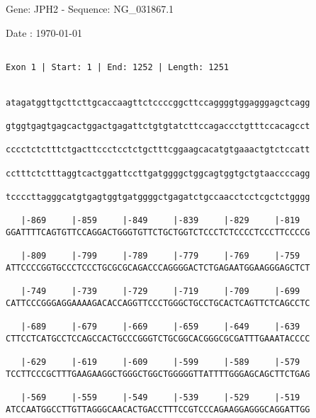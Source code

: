 \documentclass{article}
\begin{document}
\begin{center}
\begin{large}
 Gene: JPH2 - Sequence: NG\_031867.1
 
 Date : \today
\end{large}
\end{center}
 \begin{Verbatim}
 
Exon 1 | Start: 1 | End: 1252 | Length: 1251


atagatggttgcttcttgcaccaagttctccccggcttccaggggtggagggagctcagg
                                                            
gtggtgagtgagcactggactgagattctgtgtatcttccagaccctgtttccacagcct
                                                            
cccctctctttctgacttccctcctctgctttcggaagcacatgtgaaactgtctccatt
                                                            
cctttctctttaggtcactggattccttgatggggctggcagtggtgctgtaaccccagg
                                                            
tccccttagggcatgtgagtggtgatggggctgagatctgccaacctcctcgctctgggg
                                                            
   |-869     |-859     |-849     |-839     |-829     |-819  
GGATTTTCAGTGTTCCAGGACTGGGTGTTCTGCTGGTCTCCCTCTCCCCTCCCTTCCCCG
                                                            
   |-809     |-799     |-789     |-779     |-769     |-759  
ATTCCCCGGTGCCCTCCCTGCGCGCAGACCCAGGGGACTCTGAGAATGGAAGGGAGCTCT
                                                            
   |-749     |-739     |-729     |-719     |-709     |-699  
CATTCCCGGGAGGAAAAGACACCAGGTTCCCTGGGCTGCCTGCACTCAGTTCTCAGCCTC
                                                            
   |-689     |-679     |-669     |-659     |-649     |-639  
CTTCCTCATGCCTCCAGCCACTGCCCGGGTCTGCGGCACGGGCGCGATTTGAAATACCCC
                                                            
   |-629     |-619     |-609     |-599     |-589     |-579  
TCCTTCCCGCTTTGAAGAAGGCTGGGCTGGCTGGGGGTTATTTTGGGAGCAGCTTCTGAG
                                                            
   |-569     |-559     |-549     |-539     |-529     |-519  
ATCCAATGGCCTTGTTAGGGCAACACTGACCTTTCCGTCCCAGAAGGAGGGCAGGATTGG
                                                            

\end{Verbatim}
\end{document}
